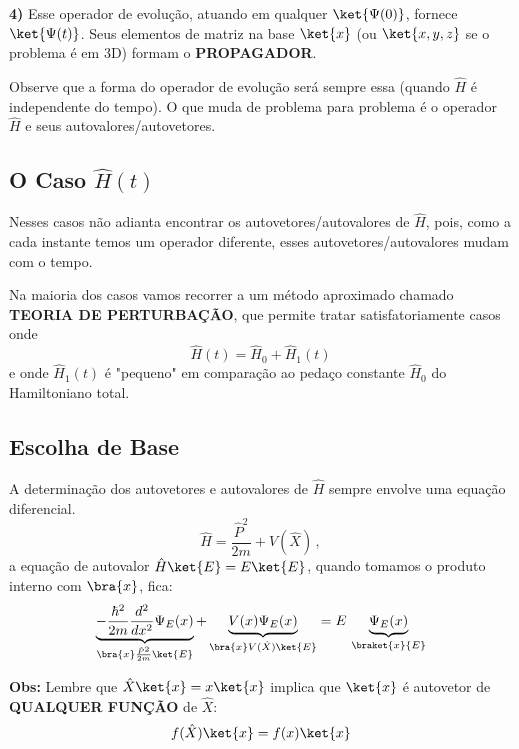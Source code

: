 \textbf{4)} Esse operador de evolução, atuando em qualquer $\ket{\Psi(0)}$, fornece $\ket{\Psi(t)}$. Seus elementos de matriz na base $\ket{x}$ (ou $\ket{x,y,z}$ se o problema é em 3D) formam o \textbf{PROPAGADOR}.

Observe que a forma do operador de evolução será sempre essa (quando $\hat{H}$ é independente do tempo). O que muda de problema para problema é o operador $\hat{H}$ e seus autovalores/autovetores.

\subsection*{O Caso $\hat{H}(t)$}

Nesses casos não adianta encontrar os autovetores/autovalores de $\hat{H}$, pois, como a cada instante temos um operador diferente, esses autovetores/autovalores mudam com o tempo.

Na maioria dos casos vamos recorrer a um método aproximado chamado \textbf{TEORIA DE PERTURBAÇÃO}, que permite tratar satisfatoriamente casos onde
\begin{equation}
    \hat{H}(t) = \hat{H}_0 + \hat{H}_1(t)
\label{eq:aula13_H_perturbacao}
\end{equation}
e onde $\hat{H}_1(t)$ é "pequeno" em comparação ao pedaço constante $\hat{H}_0$ do Hamiltoniano total.

\subsection*{Escolha de Base}

A determinação dos autovetores e autovalores de $\hat{H}$ sempre envolve uma equação diferencial.
\begin{equation}
    \hat{H} = \frac{\hat{P}^2}{2m} + V(\hat{X}) \, ,
\label{eq:aula13_H_generico}
\end{equation}
a equação de autovalor $\hat{H}\ket{E} = E\ket{E}$, quando tomamos o produto interno com $\bra{x}$, fica:
\begin{equation}
    \underbrace{-\frac{\hbar^2}{2m}\frac{d^2}{dx^2}\Psi_E(x)}_{\bra{x}\frac{\hat{P}^2}{2m}\ket{E}} + \underbrace{V(x)\Psi_E(x)}_{\bra{x}V(\hat{X})\ket{E}} = E\,\underbrace{\Psi_E(x)}_{\braket{x}{E}}
\label{eq:aula13_ES_independente_tempo_x}
\end{equation}

\textbf{Obs:} Lembre que $\hat{X}\ket{x} = x\ket{x}$ implica que $\ket{x}$ é autovetor de \textbf{QUALQUER FUNÇÃO} de $\hat{X}$:
\begin{equation}
    f(\hat{X})\ket{x} = f(x)\ket{x}
\label{eq:aula13_funcao_de_X}
\end{equation}


